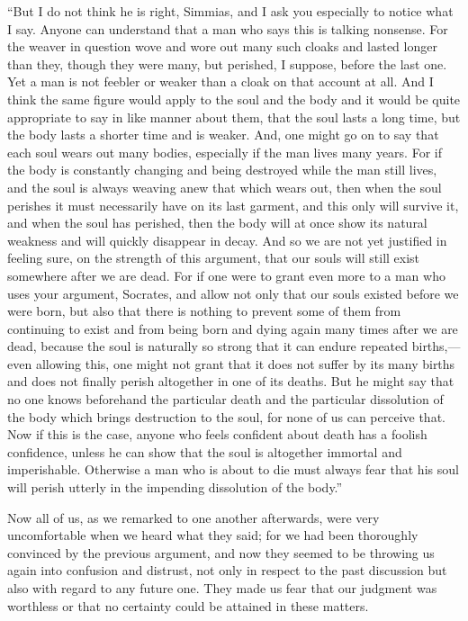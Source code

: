 \documentclass[letterpaper,12pt]{article}
\newcommand{\stephpag}[1]{\marginnote{\small\itshape\fontfamily{ppl}\selectfont #1}}
\begin{document}
\begin{drama}
``But I do not think he is right, Simmias, and I ask you especially to notice what I say. Anyone can understand that a man who says this is talking nonsense. For the weaver in question wove and wore out many such cloaks and \stephpag{d} lasted longer than they, though they were many, but perished, I suppose, before the last one. Yet a man is not feebler or weaker than a cloak on that account at all. And I think the same figure would apply to the soul and the body and it would be quite appropriate to say in like manner about them, that the soul lasts a long time, but the body lasts a shorter time and is weaker. And, one might go on to say that each soul wears out many bodies, especially if the man lives many years. For if the body is constantly changing and being destroyed while the man still lives, \stephpag{e} and the soul is always weaving anew that which wears out, then when the soul perishes it must necessarily have on its last garment, and this only will survive it, and when the soul has perished, then the body will at once show its natural weakness and will quickly disappear in decay. And so we are not yet justified in feeling sure, on the strength of this argument, \stephpag{88 a} that our souls will still exist somewhere after we are dead. For if one were to grant even more to a man who uses your argument, Socrates, and allow not only that our souls existed before we were born, but also that there is nothing to prevent some of them from continuing to exist and from being born and dying again many times after we are dead, because the soul is naturally so strong that it can endure repeated births,---even allowing this, one might not grant that it does not suffer by its many births and does not finally perish altogether in one of its deaths. \stephpag{b} But he might say that no one knows beforehand the particular death and the particular dissolution of the body which brings destruction to the soul, for none of us can perceive that. Now if this is the case, anyone who feels confident about death has a foolish confidence, unless he can show that the soul is altogether immortal and imperishable. Otherwise a man who is about to die must always fear that his soul will perish utterly in the impending dissolution of the body.''
 
Now all of us, as we remarked to one another afterwards, \stephpag{c} were very uncomfortable when we heard what they said; for we had been thoroughly convinced by the previous argument, and now they seemed to be throwing us again into confusion and distrust, not only in respect to the past discussion but also with regard to any future one. They made us fear that our judgment was worthless or that no certainty could be attained in these matters.
 

\end{drama}
\end{document}
